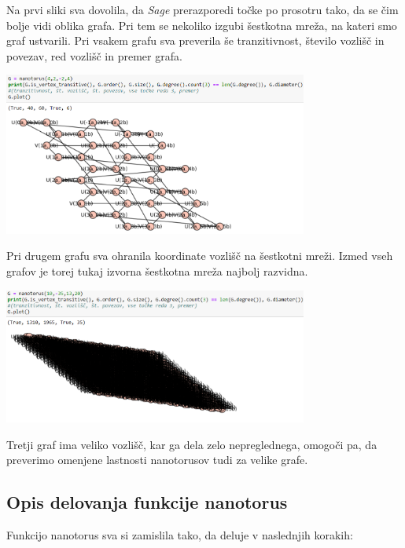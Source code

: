 \documentclass[a4paper, 10 pt, titlepage]{article}
\begin{document}
Na prvi sliki sva dovolila, da \textit{Sage} prerazporedi točke po prosotru tako, da se čim bolje vidi oblika grafa. Pri tem se nekoliko izgubi šestkotna mreža, na kateri smo graf ustvarili. Pri vsakem grafu sva preverila še tranzitivnost, število vozlišč in povezav, red vozlišč in premer grafa.
\vspace{1cm}

\begin{center}
\includegraphics[width=10cm]{nano3}
\end{center}
\vspace{1cm}

Pri drugem grafu sva ohranila koordinate vozlišč na šestkotni mreži. Izmed vseh grafov je torej tukaj izvorna šestkotna mreža najbolj razvidna.
\vspace{1cm}

\begin{center}
\includegraphics[width=10cm]{nano1}
\end{center}
\vspace{1cm}

Tretji graf ima veliko vozlišč, kar ga dela zelo nepreglednega, omogoči pa, da preverimo omenjene lastnosti nanotorusov tudi za velike grafe.

\subsection{Opis delovanja funkcije nanotorus}

Funkcijo nanotorus sva si zamislila tako, da deluje v naslednjih korakih:
\end{document}
